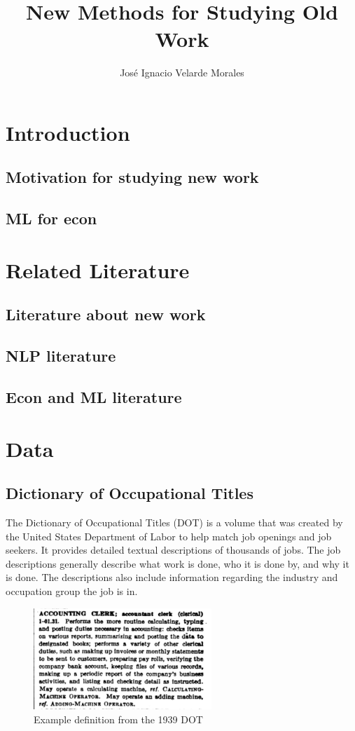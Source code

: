 \documentclass[12pt]{article}
\title{New Methods for Studying Old Work}
\author{José Ignacio Velarde Morales}
\begin{document}
\maketitle
\tableofcontents

\section{Introduction}
  \subsection{Motivation for studying new work}
  \subsection{ML for econ}

\section{Related Literature}
  \subsection{Literature about new work}
  \subsection{NLP literature}
  \subsection{Econ and ML literature}

\section{Data}
  \subsection{Dictionary of Occupational Titles}
  The Dictionary of Occupational Titles (DOT) is a volume that was created by the United States Department of Labor to help match job openings and job seekers. It provides detailed textual descriptions of thousands of jobs. The job descriptions generally describe what work is done, who it is done by, and why it is done. The descriptions also include information regarding the industry and occupation group the job is in.

  \begin{figure}[h]
    \centering
    \caption{Example definition from the 1939 DOT}
    \includegraphics[width=0.6\textwidth, keepaspectratio=true]{images/dot_def}
  \end{figure}
\end{document}
